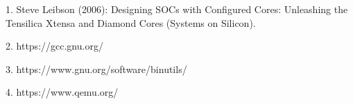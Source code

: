 
1. Steve Leibson (2006): Designing SOCs with Configured Cores: Unleashing the Tensilica Xtensa and Diamond Cores (Systems on Silicon).

2. https://gcc.gnu.org/

3. https://www.gnu.org/software/binutils/

4. https://www.qemu.org/ 
